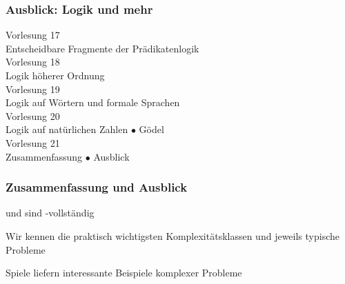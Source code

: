 \documentclass[onlymath]{beamer}
\begin{document}
\begin{frame}\frametitle{Ausblick: Logik und mehr}

\begin{center}
\alert{Vorlesung 17}\\
Entscheidbare Fragmente der Prädikatenlogik\\[1ex]
\alert{Vorlesung 18}\\
Logik höherer Ordnung \\[1ex]
\alert{Vorlesung 19}\\
Logik auf Wörtern und formale Sprachen \\[1ex]
\alert{Vorlesung 20}\\
Logik auf natürlichen Zahlen $\bullet$ Gödel\\[1ex]
\alert{Vorlesung 21}\\
Zusammenfassung $\bullet$ Ausblick
\end{center}

\end{frame}



\begin{frame}\frametitle{Zusammenfassung und Ausblick}

 und  sind \PSpace-vollständig
\bigskip

Wir kennen die praktisch wichtigsten Komplexitätsklassen und jeweils typische Probleme
\bigskip

Spiele liefern interessante Beispiele komplexer Probleme
\bigskip


\end{frame}



% 
% 
% 
% 
% 
% 
\end{document}

